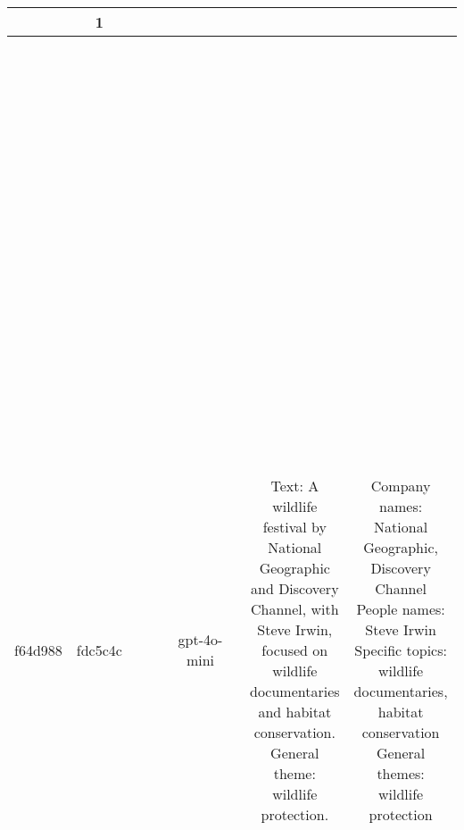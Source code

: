 \begin{table}[h!]
\begin{tabular}{|c|c|c|c|c|c|c|c|c|c|}
{OK & 1\\
\hline
f64d988 & fdc5c4c &  &  & gpt-4o-mini & Text: A wildlife festival by National Geographic and Discovery Channel, with Steve Irwin, focused on wildlife documentaries and habitat conservation. General theme: wildlife protection. & Company names: National Geographic, Discovery Channel  
People names: Steve Irwin  
Specific topics: wildlife documentaries, habitat conservation  
General themes: wildlife protection   & ok & The chatbot output follows the desired format outlined in the description. The output is structured clearly with each element being provided in its respective category, as described:

- "Company names" lists "National Geographic" and "Discovery Channel," separated by a comma.
- "People names" lists "Steve Irwin."
- "Specific topics" lists "wildlife documentaries" and "habitat conservation," separated by a comma.
- "General themes" lists "wildlife protection."

All categories are addressed in the correct format with clear and distinct separation, which complies with the description provided. There are no issues in the structure or format of the information given.

OK & 1\\
\hline
f64d988 & fdc5c4c &  &  & gemma2:9b & Text: A wildlife festival by National Geographic and Discovery Channel, with Steve Irwin, focused on wildlife documentaries and habitat conservation. General theme: wildlife protection. & Here's a breakdown of the extracted elements from your provided text:

**Company names:** National Geographic, Discovery Channel 
**People names:** Steve Irwin
**Specific topics:** wildlife festival, wildlife documentaries, habitat conservation
**General themes:** wildlife protection 


Let me know if you have any other texts you'd like me to analyze!  
 & ok & The evaluation process involves checking whether the chatbot's output format complies with the described format for extracted elements:
- The format provided requires a comma-separated list for categories: Company names, People names, Specific topics, and General Themes.
- The output is indeed using a comma-separated format for each category.

1. **Company names:** The output lists "National Geographic, Discovery Channel" with a comma-separated format, which complies with the required format.
2. **People names:** The output lists "Steve Irwin" in a format consistent with the description.
3. **Specific topics:** The output provides "wildlife festival, wildlife documentaries, habitat conservation" as a comma-separated list, meeting the expected format.
4. **General themes:** "Wildlife protection" is listed correctly and follows the specified format.

}
\end{tabular}
\end{table}
